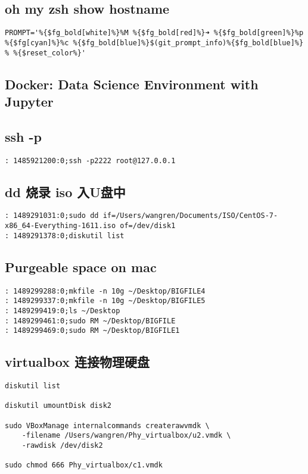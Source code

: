 \documentclass[11pt]{article}
\begin{document}
\subsection{oh my zsh show hostname}
\label{sec:org8e9639f}
\begin{verbatim}
PROMPT='%{$fg_bold[white]%}%M %{$fg_bold[red]%}➜ %{$fg_bold[green]%}%p %{$fg[cyan]%}%c %{$fg_bold[blue]%}$(git_prompt_info)%{$fg_bold[blue]%} % %{$reset_color%}'
\end{verbatim}
\subsection{Docker: Data Science Environment with Jupyter}
\label{sec:orgc9bd6e8}
\subsection{ssh -p}
\label{sec:orgd8518cb}
\begin{verbatim}
: 1485921200:0;ssh -p2222 root@127.0.0.1
\end{verbatim}
\subsection{dd 烧录 iso 入U盘中}
\label{sec:org95a6f11}
\begin{verbatim}
: 1489291031:0;sudo dd if=/Users/wangren/Documents/ISO/CentOS-7-x86_64-Everything-1611.iso of=/dev/disk1
: 1489291378:0;diskutil list
\end{verbatim}
\subsection{Purgeable space on mac}
\label{sec:orgfbe3431}
\begin{verbatim}
: 1489299288:0;mkfile -n 10g ~/Desktop/BIGFILE4
: 1489299337:0;mkfile -n 10g ~/Desktop/BIGFILE5
: 1489299419:0;ls ~/Desktop
: 1489299461:0;sudo RM ~/Desktop/BIGFILE
: 1489299469:0;sudo RM ~/Desktop/BIGFILE1
\end{verbatim}
\subsection{virtualbox 连接物理硬盘}
\label{sec:orgc593546}
\begin{verbatim}
diskutil list

diskutil umountDisk disk2

sudo VBoxManage internalcommands createrawvmdk \
    -filename /Users/wangren/Phy_virtualbox/u2.vmdk \
    -rawdisk /dev/disk2

sudo chmod 666 Phy_virtualbox/c1.vmdk
\end{verbatim}
\end{document}
